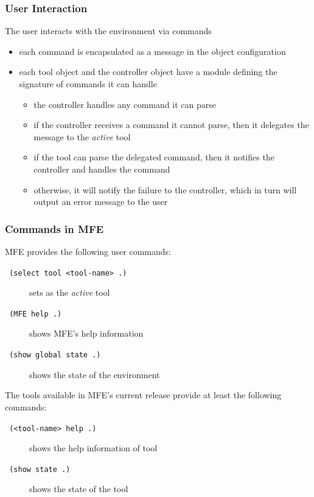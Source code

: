 \documentclass{beamer}
\begin{document}
\begin{frame}
  \frametitle{User Interaction}

  The user interacts with the environment via commands

  \begin{itemize}
    \item<2-> each command is encapsulated as a message in the object configuration
    \item<3-> each tool object and the controller object have a module defining the
      signature of commands it can handle
    \begin{itemize}
      \item the controller handles any command it can parse
      \item if the controller receives a command it cannot parse, then it delegates
        the message to the {\em active} tool
      \item if the tool can parse the delegated command, then it notifies the controller
        and handles the command
      \item otherwise, it will notify the failure to the controller, which in turn
        will output an error message to the user
    \end{itemize}
  \end{itemize}
\end{frame}

\begin{frame}
  \frametitle{Commands in MFE}
  
  MFE provides the following user commands:

  \begin{description}
    \item[\texttt{  \small(select tool <tool-name> .)}]
      sets \texttt{} as the {\em active} tool
    \item[\texttt{  \small(MFE help .)}] 
      shows MFE's help information
    \item[\texttt{  \small(show global state .)}] 
      shows the state of the environment
  \end{description}

  \vspace{0.2cm}

  \pause
  
  The tools available in MFE's current release provide at least the following
  commands:

  \begin{description}
    \item[\texttt{  \small(<tool-name> help .)}]
      shows the help information of tool \texttt{}
    \item[\texttt{  \small(show state .)}]
      shows the state of the tool
  \end{description}
\end{frame}
\end{document}
